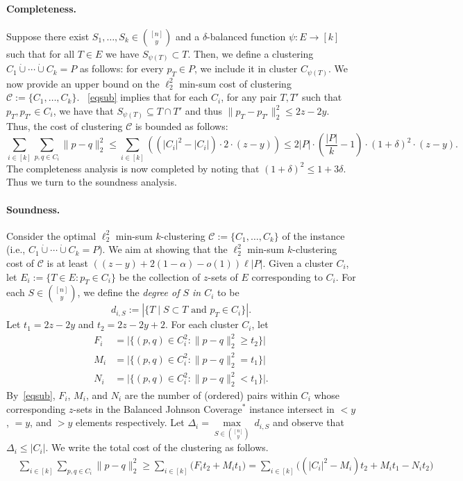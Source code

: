 \documentclass[10pt,a4paper]{amsart}
\newcommand{\jcdb}{Balanced Johnson Coverage$^*$\xspace}
\newcommand{\C}{\mathcal{C}}
\begin{document}
\paragraph{Completeness.}
Suppose there exist $S_1,\ldots ,S_k\in \binom{[n]}{y}$   and a $\delta$-balanced function $\psi:E\to [k]$ such that for all $T\in E$ we have $S_{\psi(T)}\subset T$. 
Then, we define a clustering $C_1\dot\cup\cdots\dot\cup C_k=P$  as follows: for every $p_T\in P$, we  include it in cluster $C_{\psi(T)}$.
We now provide an upper bound on the $\ell_2^2$ min-sum cost of clustering $\mathcal{C}:=\{C_1,\ldots ,C_k\}$.
~\eqref{eqsub} implies that for each $C_i$, for any pair $T, T'$ such that
$p_T,p_{T'} \in C_i$, we have that $S_{\psi(T)}\subseteq T\cap T'$ and thus $\|p_T - p_{T'} \|^2_2 \le 2z-2y$.
Thus, the cost of clustering $\C$ is bounded as follows:
$$\sum_{i\in[k]}\sum_{p,q\in C_i}\|p-q\|_2^2\le \sum_{i\in[k]}\left(\left(|C_i|^2-|C_i|\right)\cdot 2\cdot (z-y)\right)\le 2|P|\cdot \left(\frac{|P|}{k}-1\right)\cdot (1+\delta)^2\cdot (z-y).$$
The completeness analysis is now completed by noting that $(1+\delta)^2\le 1+3\delta$. Thus we turn to the soundness analysis.








\paragraph{Soundness.}
Consider the optimal $\ell_2^2$ min-sum $k$-clustering $\mathcal{C}:=\{C_1,\ldots ,C_k\}$ of the instance (i.e., $C_1\dot\cup\cdots\dot\cup C_k=P$). 
We aim at showing that the $\ell_2^2$ min-sum $k$-clustering cost of $\C$ is at
least $((z-y) + 2(1 - \alpha) - o(1))\ell |P|$. Given a cluster $C_i$,
let $E_i := \{ T \in E : p_T\in C_i \}$ be the collection of $z$-sets of $E$ corresponding to $C_i$. 
For each
$S \in \binom{[n]}{y}$, we define the \emph{degree of $S$ in $C_i$} to be 
\[d_{i, S} := \left|\{T \mid S \subset T \text{ and } p_T \in C_i\}\right|.\]
Let $t_1 = 2z - 2y$ and $t_2 = 2z - 2y + 2$. 
For each cluster $C_i$, let
\begin{align*}
F_i &= \bigg| \{ (p, q) \in C_i^2 : \| p - q \|_2^2 \geq t_2 \} \bigg| \\
M_i &= \bigg| \{ (p, q) \in C_i^2 : \| p - q \|_2^2=t_1  \} \bigg| \\
N_i &= \bigg| \{ (p, q) \in C_i^2 : \| p - q \|_2^2 < t_1  \} \bigg|.
\end{align*}
By~\eqref{eqsub}, $F_i$, $M_i$, and $N_i$ are the number of (ordered) pairs within $C_i$ whose corresponding $z$-sets in the \jcdb instance intersect in $<y$, $=y$, and $>y$ elements respectively. 
Let $\Delta_i=\underset{S\in\binom{[n]}{y} }{\max}\ d_{i,S}$ and observe that $\Delta_i\le|C_i|$. 
We write the total cost of the clustering as follows.
\begin{align}
& \sum_{i\in[k]}\sum_{p,q\in C_i}\|p-q\|_2^2 
\geq  \sum_{i\in[k]}  \bigg( F_i t_2 + M_i t_1 \bigg)   
= \sum_{i\in[k]}  \bigg( (|C_i|^2 - M_i) t_2 + M_i t_1 - N_i t_2 \bigg)
\label{eq:cost}
\end{align}
\end{document}
